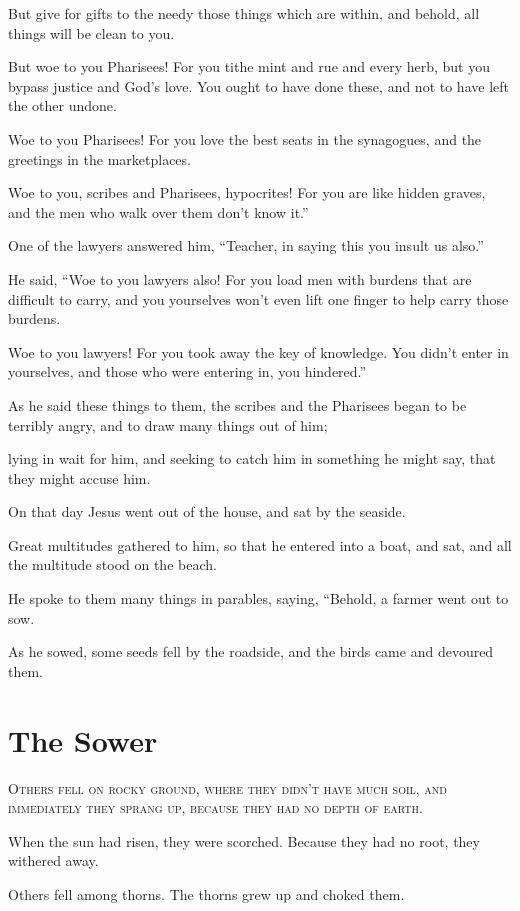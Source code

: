 But give for gifts to the needy those things which are within, and behold, all things will be clean to you.

But woe to you Pharisees! For you tithe mint and rue and every herb, but you bypass justice and God’s love. You ought to have done these, and not to have left the other undone.

Woe to you Pharisees! For you love the best seats in the synagogues, and the greetings in the marketplaces.

Woe to you, scribes and Pharisees, hypocrites! For you are like hidden graves, and the men who walk over them don’t know it.”

One of the lawyers answered him, “Teacher, in saying this you insult us also.”

He said, “Woe to you lawyers also! For you load men with burdens that are difficult to carry, and you yourselves won’t even lift one finger to help carry those burdens.

Woe to you lawyers! For you took away the key of knowledge. You didn’t enter in yourselves, and those who were entering in, you hindered.”

As he said these things to them, the scribes and the Pharisees began to be terribly angry, and to draw many things out of him;

lying in wait for him, and seeking to catch him in something he might say, that they might accuse him.

On that day Jesus went out of the house, and sat by the seaside.

Great multitudes gathered to him, so that he entered into a boat, and sat, and all the multitude stood on the beach.

He spoke to them many things in parables, saying, “Behold, a farmer went out to sow.

As he sowed, some seeds fell by the roadside, and the birds came and devoured them.


\clearpage \section*{The Sower}
\chapterornament

\lettrine{O}{thers fell on rocky ground, where they didn’t have much soil, and immediately they sprang up, because they had no depth of earth.}

When the sun had risen, they were scorched. Because they had no root, they withered away.

Others fell among thorns. The thorns grew up and choked them.

